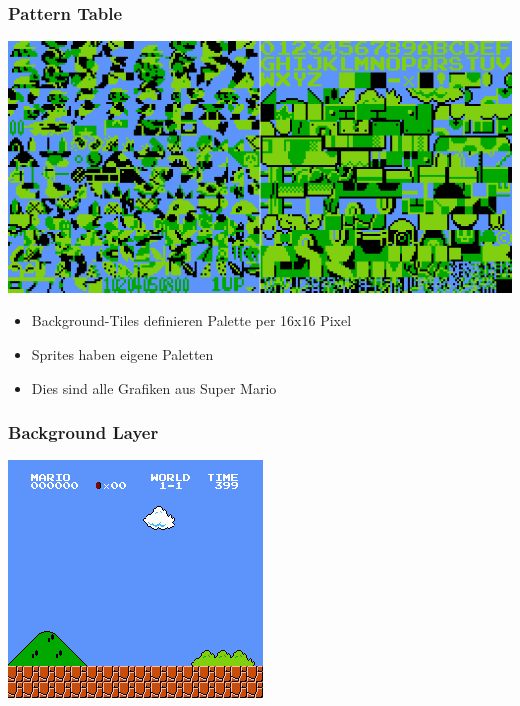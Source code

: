 \documentclass{beamer}
\begin{document}
    \begin{frame}
        \frametitle{Pattern Table}
        \includegraphics[width=0.8\linewidth]{img/pattern.png}
        \begin{itemize}
                \item{Background-Tiles definieren Palette per 16x16 Pixel}
                \item{Sprites haben eigene Paletten}
                \item{Dies sind alle Grafiken aus Super Mario}
        \end{itemize}
    \end{frame}
    
    \begin{frame}
        \frametitle{Background Layer}
        \includegraphics[width=0.8\linewidth]{img/smb_bg.png}
    \end{frame}
    
\end{document}
